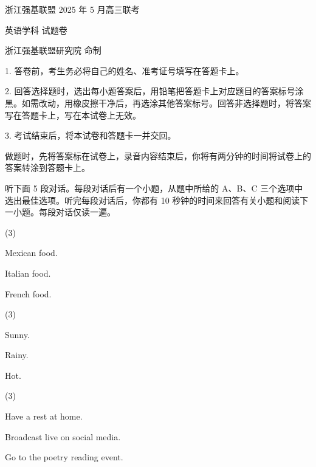 \documentclass{英语试卷}
\begin{document}
\par 浙江强基联盟 2025 年 5 月高三联考\par
\par 英语学科 试题卷\par
\par 浙江强基联盟研究院 命制\par
\begin{notice}
\par 1. 答卷前，考生务必将自己的姓名、准考证号填写在答题卡上。\par
\par 2. 回答选择题时，选出每小题答案后，用铅笔把答题卡上对应题目的答案标号涂黑。如需改动，用橡皮擦干净后，再选涂其他答案标号。回答非选择题时，将答案写在答题卡上，写在本试卷上无效。\par
\par 3. 考试结束后，将本试卷和答题卡一并交回。\par
\end{notice}
\par 做题时，先将答案标在试卷上，录音内容结束后，你将有两分钟的时间将试卷上的答案转涂到答题卡上。\par
{}
\par 听下面 5 段对话。每段对话后有一个小题，从题中所给的 A、B、C 三个选项中选出最佳选项。听完每段对话后，你都有 10 秒钟的时间来回答有关小题和阅读下一小题。每段对话仅读一遍。\par
{}
\begin{choices}(3)
  \item Mexican food.
  \item Italian food.
  \item French food.
\end{choices}
\begin{choices}(3)
  \item Sunny.
  \item Rainy.
  \item Hot.
\end{choices}
\begin{choices}(3)
  \item Have a rest at home.
  \item Broadcast live on social media.
  \item Go to the poetry reading event.
\end{choices}
\end{document}
